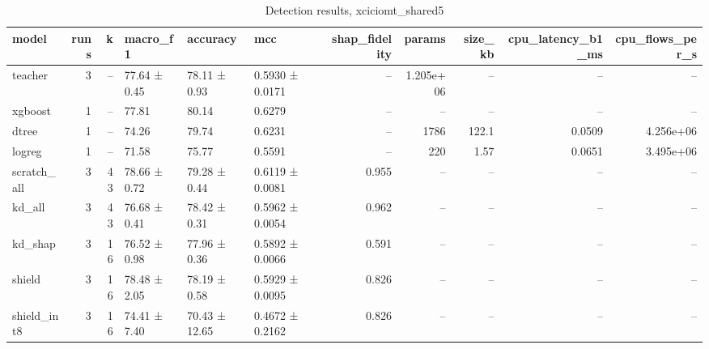 \begin{table}
\caption{Detection results, xciciomt_shared5}
\begin{tabular}{lrrlllrrrrr}
\toprule
model & runs & k & macro_f1 & accuracy & mcc & shap_fidelity & params & size_kb & cpu_latency_b1_ms & cpu_flows_per_s \\
\midrule
teacher & 3 & -- & 77.64 ± 0.45 & 78.11 ± 0.93 & 0.5930 ± 0.0171 & -- & 1.205e+06 & -- & -- & -- \\
xgboost & 1 & -- & 77.81 & 80.14 & 0.6279 & -- & -- & -- & -- & -- \\
dtree & 1 & -- & 74.26 & 79.74 & 0.6231 & -- & 1786 & 122.1 & 0.0509 & 4.256e+06 \\
logreg & 1 & -- & 71.58 & 75.77 & 0.5591 & -- & 220 & 1.57 & 0.0651 & 3.495e+06 \\
scratch_all & 3 & 43 & 78.66 ± 0.72 & 79.28 ± 0.44 & 0.6119 ± 0.0081 & 0.955 & -- & -- & -- & -- \\
kd_all & 3 & 43 & 76.68 ± 0.41 & 78.42 ± 0.31 & 0.5962 ± 0.0054 & 0.962 & -- & -- & -- & -- \\
kd_shap & 3 & 16 & 76.52 ± 0.98 & 77.96 ± 0.36 & 0.5892 ± 0.0066 & 0.591 & -- & -- & -- & -- \\
shield & 3 & 16 & 78.48 ± 2.05 & 78.19 ± 0.58 & 0.5929 ± 0.0095 & 0.826 & -- & -- & -- & -- \\
shield_int8 & 3 & 16 & 74.41 ± 7.40 & 70.43 ± 12.65 & 0.4672 ± 0.2162 & 0.826 & -- & -- & -- & -- \\
\bottomrule
\end{tabular}
\end{table}

